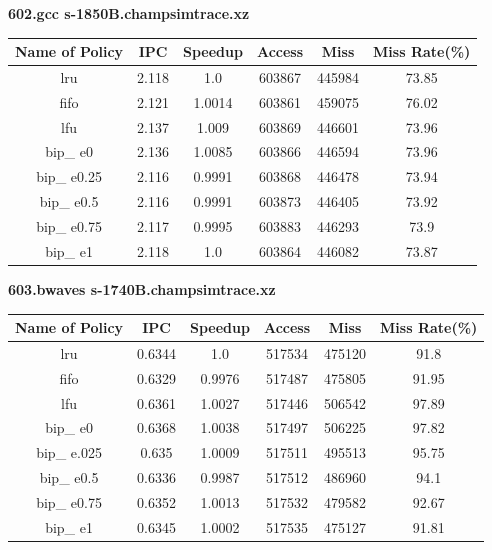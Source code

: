 \documentclass{article}
\begin{document}
\begin{description}
  \item \textbf{602.gcc s-1850B.champsimtrace.xz}\\
  \begin{table}[H]
  \centering
  \begin{tabular}{|c|c|c|c|c|c|}
  \hline
  \textbf{Name of Policy} & \textbf{IPC} & \textbf{Speedup} & \textbf{Access} & \textbf{Miss} & \textbf{Miss Rate(\%)}\\ \hline
lru & 2.118 & 1.0 & 603867 & 445984 & 73.85 \\ \hline
fifo & 2.121 & 1.0014 & 603861 & 459075 & 76.02 \\ \hline
lfu & 2.137 & 1.009 & 603869 & 446601 & 73.96 \\ \hline
bip\_ e0 & 2.136 & 1.0085 & 603866 & 446594 & 73.96 \\ \hline
bip\_ e0.25 & 2.116 & 0.9991 & 603868 & 446478 & 73.94 \\ \hline
bip\_ e0.5 & 2.116 & 0.9991 & 603873 & 446405 & 73.92 \\ \hline
bip\_ e0.75 & 2.117 & 0.9995 & 603883 & 446293 & 73.9 \\ \hline
bip\_ e1 & 2.118 & 1.0 & 603864 & 446082 & 73.87 \\ \hline
\end{tabular}
\end{table}
  \item \textbf{603.bwaves s-1740B.champsimtrace.xz}\\
  \begin{table}[H]
  \centering
  \begin{tabular}{|c|c|c|c|c|c|}
  \hline
  \textbf{Name of Policy} & \textbf{IPC} & \textbf{Speedup} & \textbf{Access} & \textbf{Miss} & \textbf{Miss Rate(\%)}\\ \hline
lru & 0.6344 & 1.0 & 517534 & 475120 & 91.8 \\ \hline
fifo & 0.6329 & 0.9976 & 517487 & 475805 & 91.95 \\ \hline
lfu & 0.6361 & 1.0027 & 517446 & 506542 & 97.89 \\ \hline
bip\_ e0 & 0.6368 & 1.0038 & 517497 & 506225 & 97.82 \\ \hline
bip\_ e.025 & 0.635 & 1.0009 & 517511 & 495513 & 95.75 \\ \hline
bip\_ e0.5 & 0.6336 & 0.9987 & 517512 & 486960 & 94.1 \\ \hline
bip\_ e0.75 & 0.6352 & 1.0013 & 517532 & 479582 & 92.67 \\ \hline
bip\_ e1 & 0.6345 & 1.0002 & 517535 & 475127 & 91.81 \\ \hline


\end{tabular}
\end{table}
\end{description}
\end{document}
